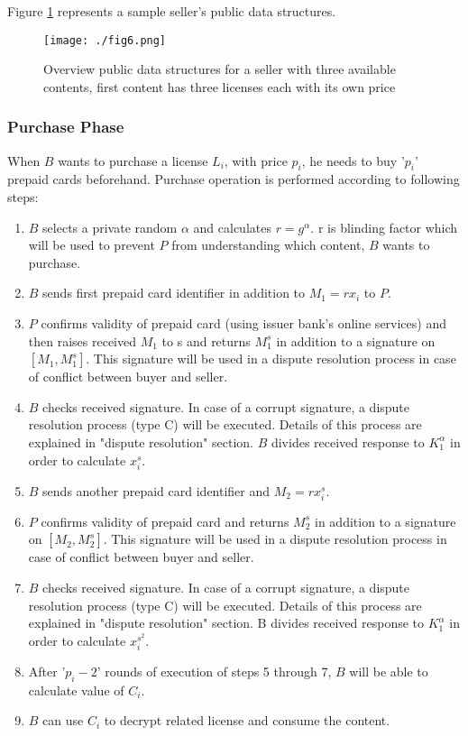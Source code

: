 \documentclass[times]{secauth}
\begin{document}
Figure \ref{fig_datastructure} represents a sample seller's public data structures.

\begin{figure}
\centering
\texttt{[image: ./fig6.png]}
\caption{Overview public data structures for a seller with three available contents, first content has three licenses each with its own price}
\label{fig_datastructure}
\end{figure}

\subsubsection{Purchase Phase}
When $B$ wants to purchase a license $L_i$, with price $p_i$, he needs to buy '$p_i$' prepaid cards beforehand. Purchase operation is performed according to following steps:
\begin{enumerate}
\item $B$ selects a private random $\alpha$ and calculates $r=g^\alpha$. r is blinding factor which will be used to prevent $P$ from understanding which content, $B$ wants to purchase.
\item $B$ sends first prepaid card identifier in addition to $M_1=rx_i$ to $P$.
\item $P$ confirms validity of prepaid card (using issuer bank's online services) and then raises received $M_1$ to s and returns $M_1^s$  in addition to a signature on $[M_1,M_1^s]$. This signature will be used in a dispute resolution process in case of conflict between buyer and seller.
\item $B$ checks received signature. In case of a corrupt signature, a dispute resolution process (type C) will be executed. Details of this process are explained in "dispute resolution" section. $B$ divides received response to $K_1^\alpha$ in order to calculate $x_i^s$.
\item $B$ sends another prepaid card identifier and $M_2=rx_i^s$.
\item $P$ confirms validity of prepaid card and returns $M_2^s$ in addition to a signature on $[M_2,M_2^s]$. This signature will be used in a dispute resolution process in case of conflict between buyer and seller.
\item $B$ checks received signature. In case of a corrupt signature, a dispute resolution process (type C) will be executed. Details of this process are explained in "dispute resolution" section. B divides received response to $K_1^\alpha$ in order to calculate $x_i^{s^2}$.
\item After '$p_i-2$' rounds of execution of steps 5 through 7, $B$ will be able to calculate value of $C_i$.
\item $B$ can use $C_i$ to decrypt related license and consume the content.
\end{enumerate}
	
\end{document}
